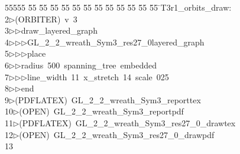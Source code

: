 %
%
\begin{tabbing}
55555 \= 55 \= 55 \= 55 \= 55 \= 55 \= 55 \= 55 \= 55 \= 55 \= 55 \= 55 \= 55 \= \>T3r1\_orbits\_draw:\\[0pt]
2\>$\triangleright$\>(ORBITER)\ v\ 3\ \\[0pt]
3\>$\triangleright$\>$\triangleright$\>draw\_layered\_graph\ \\[0pt]
4\>$\triangleright$\>$\triangleright$\>$\triangleright$\>GL\_2\_2\_wreath\_Sym3\_res27\_0layered\_graph\ \\[0pt]
5\>$\triangleright$\>$\triangleright$\>$\triangleright$\>place\ \\[0pt]
6\>$\triangleright$\>$\triangleright$\>radius\ 500\ spanning\_tree\ embedded\ \\[0pt]
7\>$\triangleright$\>$\triangleright$\>$\triangleright$\>line\_width\ 11\ x\_stretch\ 14\ scale\ 025\ \\[0pt]
8\>$\triangleright$\>$\triangleright$\>end\\[0pt]
9\>$\triangleright$\>(PDFLATEX)\ GL\_2\_2\_wreath\_Sym3\_reporttex\\[0pt]
10\>$\triangleright$\>(OPEN)\ GL\_2\_2\_wreath\_Sym3\_reportpdf\\[0pt]
11\>$\triangleright$\>(PDFLATEX)\ GL\_2\_2\_wreath\_Sym3\_res27\_0\_drawtex\\[0pt]
12\>$\triangleright$\>(OPEN)\ GL\_2\_2\_wreath\_Sym3\_res27\_0\_drawpdf\\[0pt]
13\>\end{tabbing}
